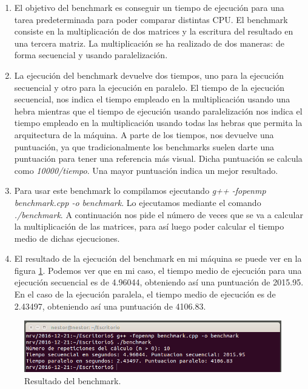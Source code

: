 \documentclass[a4paper,titlepage,12pt]{scrartcl}	%
\numberwithin{figure}{section} %
\numberwithin{table}{section} %
\begin{document}
	\begin{enumerate}
		\item El objetivo del benchmark es conseguir un tiempo de ejecución para una tarea predeterminada para poder comparar distintas CPU. El benchmark consiste en la multiplicación de dos matrices y la escritura del resultado en una tercera matriz. La multiplicación se ha realizado de dos maneras: de forma secuencial y usando paralelización.
		
		\item La ejecución del benchmark devuelve dos tiempos, uno para la ejecución secuencial y otro para la ejecución en paralelo. El tiempo de la ejecución secuencial, nos indica el tiempo empleado en la multiplicación usando una hebra mientras que el tiempo de ejecución usando paralelización nos indica el tiempo empleado en la multiplicación usando todas las hebras que permita la arquitectura de la máquina. A parte de los tiempos, nos devuelve una puntuación, ya que tradicionalmente los benchmarks suelen darte una puntuación para tener una referencia más visual. Dicha puntuación se calcula como \textit{10000/tiempo}. Una mayor puntuación indica un mejor resultado.
		
		\item Para usar este benchmark lo compilamos ejecutando \textit{g++ -fopenmp benchmark.cpp -o benchmark}. Lo ejecutamos mediante el comando \textit{./benchmark}. A continuación nos pide el número de veces que se va a calcular la multiplicación de las matrices, para así luego poder calcular el tiempo medio de dichas ejecuciones.
		
		\item El resultado de la ejecución del benchmark en mi máquina se puede ver en la figura \ref{5-benchmark}. Podemos ver que en mi caso, el tiempo medio de ejecución para una ejecución secuencial es de 4.96044, obteniendo así una puntuación de 2015.95. En el caso de la ejecución paralela, el tiempo medio de ejecución es de 2.43497, obteniendo así una puntuación de 4106.83.
	\end{enumerate}
	
	\begin{figure}[H]
		\includegraphics[width=\linewidth]{./Imagenes/5-benchmark.png}
		\vspace{-0.5cm}
		\caption[Resultado del benchmark.]{Resultado del benchmark.}
		\label{5-benchmark}
	\end{figure}
	
\end{document}
